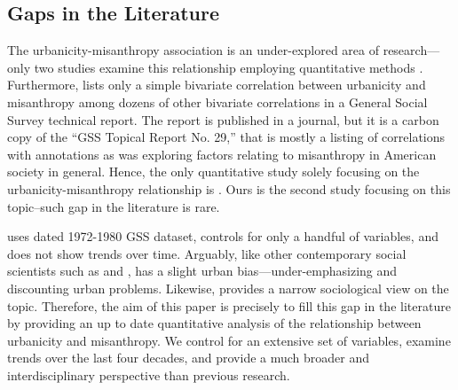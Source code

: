 \documentclass[11pt, letterpaper]{article}
\begin{document}
\begin{spacing}{1.4}
\section*{Gaps in the Literature} 

The urbanicity-misanthropy association is an under-explored area of research---only two studies examine this relationship employing quantitative methods \citep{wilson85,smith97}. Furthermore, \citet{smith97} lists only a simple bivariate correlation between urbanicity and misanthropy among dozens of other bivariate correlations in a General Social Survey technical report. The report is published in a journal, but it is a carbon copy of the ``GSS Topical Report No. 29,'' that is mostly a listing of correlations with annotations as \citet{smith97} was exploring factors relating to misanthropy in American society in general.
Hence, the only quantitative study solely focusing on the urbanicity-misanthropy
relationship is \citet{wilson85}. Ours is the second study focusing on this topic--such gap in the literature is rare.

\citet{wilson85} uses dated 1972-1980 GSS dataset, controls for only a
handful of variables, and does not show trends over time.  Arguably, like other contemporary social scientists such as \citet[e.g.,][]{veenhoven94,meyer13} and \citet[e.g.,][]{fischer82}, \citeauthor{wilson85} has a slight urban bias---under-emphasizing and discounting urban problems. Likewise, \citet{wilson85} provides a narrow sociological view on the topic. Therefore, the aim of this paper is precisely to fill this gap in the literature by providing an up to date quantitative analysis of the relationship between urbanicity and misanthropy. We control  for an extensive set of variables, examine trends over the last four decades, and provide a much broader and interdisciplinary perspective than previous research. 


\end{spacing}
\end{document}
